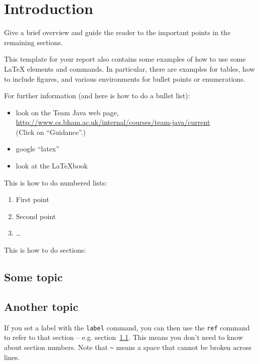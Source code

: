 
\chapter{Introduction}
\label{cha:introduction}

Give a brief overview and guide the reader to the important points
in the remaining sections.

This template for your report also contains some examples of how to use some
{\LaTeX} elements and commands. In particular, there are examples for tables,
how to include figures, and various environments for bullet points or
enumerations.

For further information (and here is how to do a bullet list):
\begin{itemize}
\item look on the Team Java web page,\\
\url{http://www.cs.bham.ac.uk/internal/courses/team-java/current}\\
  (Click on ``Guidance''.)
\item google ``latex''
\item look at the \LaTeX book \cite{latex}
\end{itemize}


This is how to do numbered lists:
\begin{enumerate}
\item First point
\item Second point
\item \ldots
\end{enumerate}

This is how to do sections:

\section{Some topic}\label{some}

\section{Another topic}\label{another}

If you set a label with the \texttt{label} command, you can then use
the \texttt{ref} command to refer to that section -- e.g.
section~\ref{some}. This means you don't need to know about section
numbers. Note that \texttt{\~} means a space that cannot be broken
across lines.

